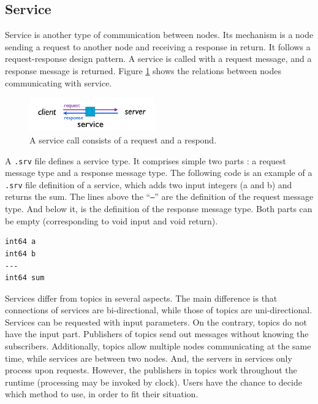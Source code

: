 \documentclass[a4paper, 10pt, conference]{ieeeconf}       %
\begin{document}
\subsection{Service}

Service is another type of communication between nodes. Its mechanism is a node sending a request to another node and receiving a response in return. It follows a request-response design pattern. A service is called with a request message, and a response message is returned. Figure \ref{fig:service} shows the relations between nodes communicating with service.

\begin{figure}[htpb]
  \centering
  \includegraphics[width=0.48\textwidth]{service}
  \caption{A service call consists of a request and a respond.}
  \label{fig:service}
\end{figure}

A \texttt{.srv} file defines a service type. It comprises simple two parts : a request message type and a response message type. The following code is an example of a \texttt{.srv} file definition of a service, which adds two input integers (a and b) and returns the sum. The lines above the ``\texttt{---}'' are the definition of the request message type. And below it, is the definition of the response message type. Both parts can be empty (corresponding to void input and void return).

\vspace{8pt}
\begin{Verbatim}[frame=single]
int64 a
int64 b
---
int64 sum
\end{Verbatim}

  Services differ from topics in several aspects. The main difference is that connections of services are bi-directional, while those of topics are uni-directional. Services can be requested with input parameters. On the contrary, topics do not have the input part. Publishers of topics send out messages without knowing the subscribers. Additionally, topics allow multiple nodes communicating at the same time, while services are between two nodes. And, the servers in services only process upon requests. However, the publishers in topics work throughout the runtime (processing may be invoked by clock). Users have the chance to decide which method to use, in order to fit their situation.
\end{document}
